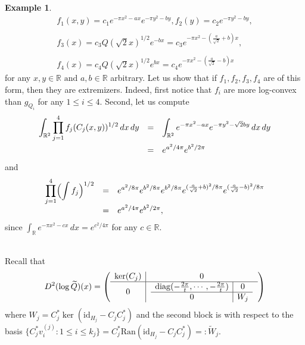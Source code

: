 \documentclass[11pt,a4paper,reqno]{amsart}
\numberwithin{equation}{section}
\theoremstyle{definition}
\newtheorem{example}[theorem]{Example}
\newcommand{\nm}{\noalign{\smallskip}}
\newcommand{\ds}{\displaystyle}
\renewcommand{\tilde}{\widetilde}
\newcommand{\<}{\ensuremath \leq}
\renewcommand{\>}{\ensuremath \geq}
\renewcommand{\tilde}{\widetilde}
\begin{document}
\begin{example}
$$\begin{array}{lll} f_1(x,y)=c_1 e^{-\pi x^2-ax}e^{-\pi y^2-by}, f_2(y)=c_2e^{-\pi y^2-by}, \\ \\
f_3(x)=c_3Q(\sqrt{2}x)^{1/2}e^{-bx}=c_3e^{-\pi x^2-(\frac{a}{\sqrt 2}+b)x}, \\ \\
f_4(x)=c_4Q(\sqrt 2x)^{1/2}e^{bx}=c_4 e^{-\pi x^2-(\frac{a}{\sqrt 2}-b)x}\end{array}$$ for any $x,y \in \mathbb{R} \text{ and } a,b \in \mathbb{R}$ arbitrary. Let us show that if $f_1,f_2,f_3,f_4$ are of this form, then they are extremizers. Indeed, first notice that $f_i$ are more log-convex than $g_{Q_i}$ for any $1 \leq i \leq 4.$ Second, let us compute $$\begin{array}{lll}
\ds \int_{\mathbb{R}^2}\prod_{j=1}^4 f_j(C_j(x,y))^{1/2}\, dx \, dy &=& \ds \int_{\mathbb{R}^2}e^{-\pi x^2-ax}e^{-\pi y^2-\sqrt 2 by}\, dx \, dy \\
\nm 
&=& \ds e^{a^2/4\pi}e^{b^2/2\pi} 
\end{array}$$ and $$\begin{array}{lll}
    \ds \prod_{j=1}^4 \Bigl( \int f_j \Bigl)^{1/2} &=& \ds e^{a^2/8\pi}e^{b^2/8\pi} e^{b^2/8\pi}e^{(\frac{a}{\sqrt 2}+b)^2/8\pi}e^{(\frac{a}{\sqrt 2}-b)^2/8\pi}  \\
     &=& e^{a^2/4\pi}e^{b^2/2\pi},
\end{array}$$ since $\int_{\mathbb{R}}e^{-\pi x^2-cx}\, dx=e^{c^2/4\pi}$ for any $c \in \mathbb{R}.$  
\end{example}



\bigskip 

\hfill \\







Recall that $$D^2(\log \tilde Q)(x)=\left(\begin{array}{ c | c }
    \ker(C_j) & 0 \\
    \hline
    0 & \left. \begin{array}{ c | c }
    \mathrm{diag}(-\frac{2\pi}{t},\cdots,-\frac{2\pi}{t}) & 0 \\
    \hline
    0 & W_j
  \end{array} \right.
  \end{array}\right)$$
where $W_j=C_j^*\ker(\mathrm{id}_{H_j}-C_jC_j^*)$ and the second block is with respect to the basis $\{C_j^*v_i^{(j)}: 1 \leq i \leq k_j\}=C_j^*\mathrm{Ran}(\mathrm{id}_{H_j}-C_jC_j^*) =: \tilde W_j.$
\end{document}
